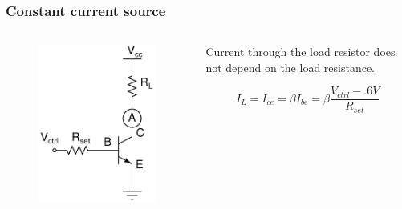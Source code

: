 \documentclass[beamer]{standalone}
\begin{document}
\begin{frame}
\frametitle{Constant current source}
	\begin{columns}[c]
		\begin{column}{.35\textwidth}
			\begin{figure}
				\includegraphics[height=0.60\textheight]{./schematics/npn_constant_current_source.pdf}
			\end{figure}

		\end{column}
		\begin{column}{.65\textwidth}
			Current through the load resistor does not depend on the load
			resistance.

			\begin{equation*}
				I_L= I_{ce} = \beta I_{be} = \beta \frac{V_{ctrl}-.6V}{R_{set}} 
			\end{equation*}




		\end{column}
	\end{columns}
\end{frame}
	
\end{document}
